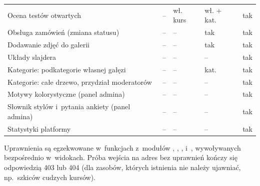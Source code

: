 \begin{table}[H]
\begin{tabularx}{\linewidth}{@{}L>{\centering\arraybackslash}p{1.1cm}>{\centering\arraybackslash}p{1.1cm}>{\centering\arraybackslash}p{1.85cm}>{\centering\arraybackslash}p{1.4cm}@{}}
Ocena testów otwartych & -- & wł. kurs & wł. + kat. & tak \\
Obsługa zamówień (zmiana statusu) & -- & -- & tak & tak \\
Dodawanie zdjęć do galerii & -- & -- & tak & tak \\
Układy slajdera & -- & -- & -- & tak \\
Kategorie: podkategorie własnej gałęzi & -- & -- & kat. & tak \\
Kategorie: całe drzewo, przydział moderatorów & -- & -- & -- & tak \\
Motywy kolorystyczne (panel admina) & -- & -- & -- & tak \\
Słownik stylów i~pytania ankiety (panel admina) & -- & -- & -- & tak \\
Statystyki platformy & -- & -- & -- & tak \\
\bottomrule
\end{tabularx}
\end{table}

Uprawnienia są egzekwowane w~funkcjach z~modułów ,
, ,  i~,
wywoływanych bezpośrednio w~widokach. Próba wejścia na adres bez uprawnień kończy się
odpowiedzią 403 lub 404 (dla zasobów, których istnienia nie należy ujawniać, np.\
szkiców cudzych kursów).
